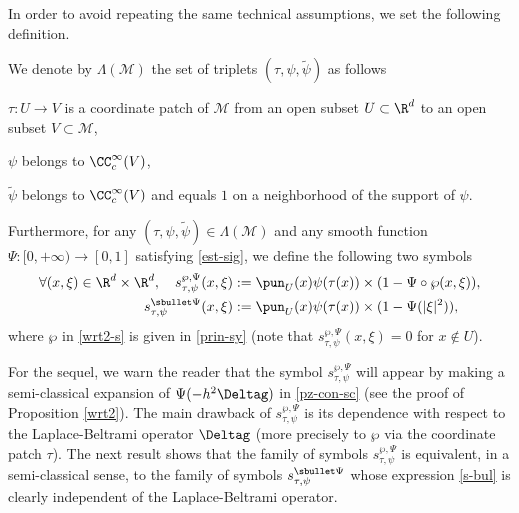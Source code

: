 In order to avoid repeating the same technical assumptions, we set the following definition.
\begin{defi}\label{defi-LM} We denote by $\Lambda(\mathcal{M})$ the set of triplets $(\tau,\psi,\widetilde{\psi})$ as follows
\begin{enumeratei}
\item $\tau:U\to V$ is a coordinate patch of $\mathcal{M}$ from an open subset $U\subset \R^d$ to an open subset $V\subset \mathcal{M}$,
\item $\psi$ belongs to $\CC_c^\infty(V)$,
\item $\widetilde{\psi}$ belongs to $\CC_c^\infty(V)$ and equals $1$ on a neighborhood of the support of $\psi$.
\end{enumeratei}
Furthermore, for any $(\tau,\psi,\widetilde{\psi})\in \Lambda(\mathcal{M})$ and any smooth function $\Psi:[0,+\infty)\to [0,1]$ satisfying \eqref{est-sig}, we define the following two symbols
\begin{align}\label{wrt2-s}
\forall (x,\xi)\in \R^d \times \R^d, \quad
s_{\tau,\psi}^{\wp,\Psi}(x,\xi)&:= \pun_{U}(x)\psi(\tau(x))\times (1-\Psi\circ\wp(x,\xi)), \\ \label{s-bul}
s_{\tau,\psi}^{\sbullet \Psi}(x,\xi)&:= \pun_{U}(x)\psi(\tau(x))\times (1-\Psi(|\xi|^2)),
\end{align}
where $\wp$ in \eqref{wrt2-s} is given in \eqref{prin-sy} (note that $s_{\tau,\psi}^{\wp,\Psi}(x,\xi)=0$ for $x\not \in U$).
\end{defi}

For the sequel, we warn the reader that the symbol $s_{\tau,\psi}^{\wp,\Psi}$ will appear by making a semi-classical expansion of $\Psi(-h^2 \Deltag)$ in \eqref{pz-con-sc} (see the proof of Proposition \ref{wrt2}).
The main drawback of $s_{\tau,\psi}^{\wp,\Psi}$ is its dependence with respect to the Laplace-Beltrami operator $\Deltag$ (more precisely to $\wp$ via the coordinate patch $\tau$).
The next result shows that the family of symbols $s_{\tau,\psi}^{\wp,\Psi}$ is equivalent, in a semi-classical sense, to the family of symbols $s_{\tau,\psi}^{\sbullet \Psi}$ whose expression \eqref{s-bul} is clearly independent of the Laplace-Beltrami operator.

